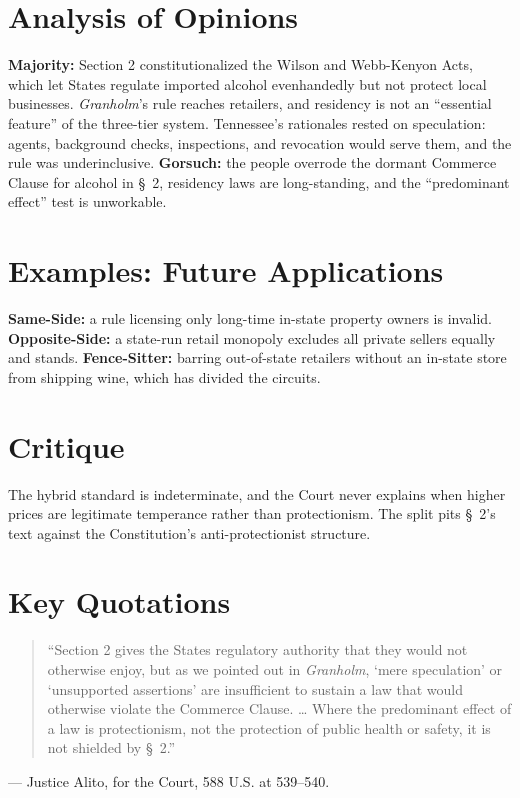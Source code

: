 \documentclass[12pt]{article}
\begin{document}
\section{Analysis of Opinions}
\textbf{Majority:} Section 2 constitutionalized the Wilson and Webb-Kenyon Acts, which let States regulate imported alcohol evenhandedly but not protect local businesses. \textit{Granholm}'s rule reaches retailers, and residency is not an ``essential feature'' of the three-tier system. Tennessee's rationales rested on speculation: agents, background checks, inspections, and revocation would serve them, and the rule was underinclusive. \textbf{Gorsuch:} the people overrode the dormant Commerce Clause for alcohol in \S~2, residency laws are long-standing, and the ``predominant effect'' test is unworkable.

\section{Examples: Future Applications}
\textbf{Same-Side:} a rule licensing only long-time in-state property owners is invalid. \textbf{Opposite-Side:} a state-run retail monopoly excludes all private sellers equally and stands. \textbf{Fence-Sitter:} barring out-of-state retailers without an in-state store from shipping wine, which has divided the circuits.

\section{Critique}
The hybrid standard is indeterminate, and the Court never explains when higher prices are legitimate temperance rather than protectionism. The split pits \S~2's text against the Constitution's anti-protectionist structure.

\section{Key Quotations}
\begin{quote}
``Section 2 gives the States regulatory authority that they would not otherwise enjoy, but as we pointed out in \textit{Granholm}, `mere speculation' or `unsupported assertions' are insufficient to sustain a law that would otherwise violate the Commerce Clause. \ldots{} Where the predominant effect of a law is protectionism, not the protection of public health or safety, it is not shielded by \S~2.''
\end{quote}
\noindent --- Justice Alito, for the Court, 588 U.S. at 539--540.
\end{document}
